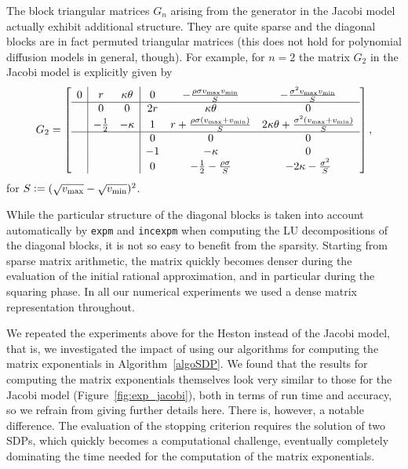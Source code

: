 \begin{remark}
    \begin{rm}
    The block triangular matrices $G_n$ arising from the generator in
    the Jacobi model actually exhibit additional structure. They are quite sparse and the diagonal blocks
    are in fact permuted triangular matrices (this does not hold for
    polynomial diffusion models in general, though). For example, for $n=2$ the matrix $G_2$ in the Jacobi model is explicitly given by
\begin{equation*}
    G_2 = \left[
    \begin{array}{c|cc|ccc}
        0& r     &\kappa \theta &0&-\frac{\rho \sigma v_\text{max}v_\text{min}}{S}&-\frac{\sigma^2 v_\text{max}v_\text{min}}{S}\\ \hline
        & 0    & 0 &2r&\kappa \theta&0\\
        &  -\frac{1}{2} & -\kappa&1&r+\frac{\rho \sigma (v_\text{max}+v_\text{min})}{S}& 2\kappa\theta +\frac{\sigma^2( v_\text{max}+v_\text{min})}{S}\\ \hline
       &     &&0&0&0\\
        &     & &-1&-\kappa&0\\
        &    & &0&-\frac{1}{2}-\frac{\rho \sigma }{S}&-2\kappa-\frac{\sigma^2}{S}\\
    \end{array}
    \right],
\end{equation*}
    for $S\mathrel{\mathop:}= (\sqrt{v_{\max}}-\sqrt{v_{\min}})^2$.
    
    While the
    particular structure of the diagonal blocks is taken into account automatically by \texttt{expm} and
    \texttt{incexpm} when computing the LU decompositions of the diagonal blocks, it is not so easy to benefit from the sparsity.
    Starting from sparse matrix arithmetic, the matrix quickly becomes 
    denser during the evaluation of the initial rational
    approximation, and in particular during the squaring phase.  In
    all our numerical experiments we used a dense matrix
    representation throughout.
    \end{rm}
\end{remark}

We repeated the experiments above for the Heston instead of the Jacobi model, that is, we investigated the impact of using our algorithms for computing the matrix exponentials in Algorithm~\ref{algoSDP}. We found that the results for computing the matrix exponentials themselves look very similar to those for the Jacobi model (Figure~\ref{fig:exp_jacobi}), both
in terms of run time and accuracy, so we refrain from giving further
details here. There is, however, a notable difference. The
evaluation of the stopping criterion requires the solution of two SDPs, which quickly becomes a
computational challenge, eventually completely dominating the time needed for
the computation of the matrix exponentials. 
